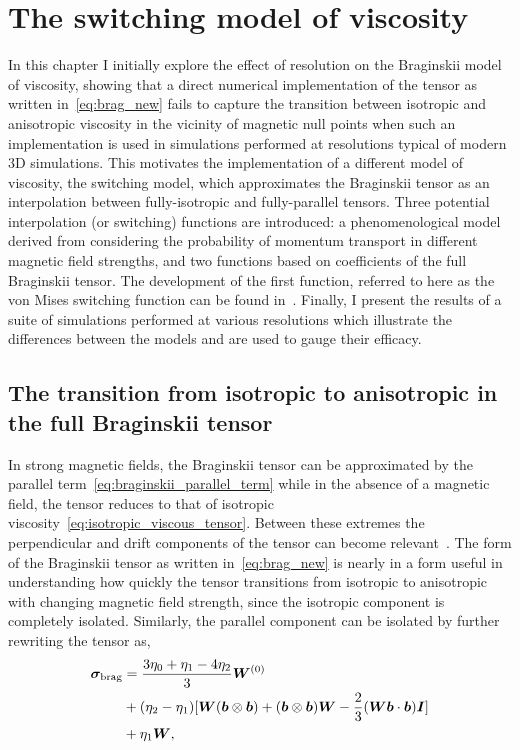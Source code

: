\chapter{The switching model of viscosity}
\label{chp:switching_model}

\graphicspath{{images/development_of_switching_model/}}

In this chapter I initially explore the effect of resolution on the Braginskii model of viscosity, showing that a direct numerical implementation of the tensor as written in~\eqref{eq:brag_new} fails to capture the transition between isotropic and anisotropic viscosity in the vicinity of magnetic null points when such an implementation is used in simulations performed at resolutions typical of modern 3D simulations. This motivates the implementation of a different model of viscosity, the switching model, which approximates the Braginskii tensor as an interpolation between fully-isotropic and fully-parallel tensors. Three potential interpolation (or switching) functions are introduced: a phenomenological model derived from considering the probability of momentum transport in different magnetic field strengths, and two functions based on coefficients of the full Braginskii tensor. The development of the first function, referred to here as the von Mises switching function can be found in~\cite{mactaggartBraginskiiMagnetohydrodynamicsArbitrary2017}. Finally, I present the results of a suite of simulations performed at various resolutions which illustrate the differences between the models and are used to gauge their efficacy.

\section{The transition from isotropic to anisotropic in the full Braginskii tensor}

In strong magnetic fields, the Braginskii tensor can be approximated by the parallel term~\eqref{eq:braginskii_parallel_term} while in the absence of a magnetic field, the tensor reduces to that of isotropic viscosity~\eqref{eq:isotropic_viscous_tensor}. Between these extremes the perpendicular and drift components of the tensor can become relevant~\cite{erdelyiResonantAbsorptionAlfven1995a}. The form of the Braginskii tensor as written in~\eqref{eq:brag_new} is nearly in a form useful in understanding how quickly the tensor transitions from isotropic to anisotropic with changing magnetic field strength, since the isotropic component is completely isolated. Similarly, the parallel component can be isolated by further rewriting the tensor as,
\begin{equation}
\begin{split}
{\bm \sigma}_{\rm brag} &= \frac{3\eta_0+\eta_1-4\eta_2}{3}{\bm W}^{(0)}\\
& + (\eta_2-\eta_1)[{\bm W}({\bm b}\otimes{\bm b})+({\bm b}\otimes{\bm b}){\bm W} - \frac{2}{3}({\bm W}{\bm b}\cdot{\bm b}){\bm I}] \\
& + \eta_1{\bm W},
\end{split}
\label{eq:brag_new2}
\end{equation}

